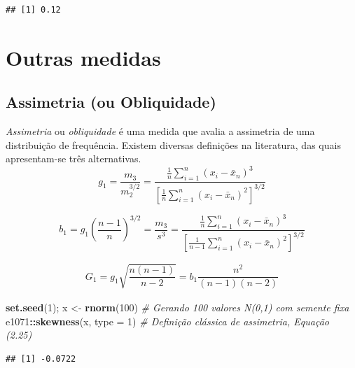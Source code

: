 \documentclass[
]{book}
\newenvironment{Shaded}{\begin{snugshade}}{\end{snugshade}}
\newcommand{\CommentTok}[1]{\textcolor[rgb]{0.56,0.35,0.01}{\textit{#1}}}
\newcommand{\DataTypeTok}[1]{\textcolor[rgb]{0.13,0.29,0.53}{#1}}
\newcommand{\DecValTok}[1]{\textcolor[rgb]{0.00,0.00,0.81}{#1}}
\newcommand{\KeywordTok}[1]{\textcolor[rgb]{0.13,0.29,0.53}{\textbf{#1}}}
\newcommand{\NormalTok}[1]{#1}
\newcommand{\OperatorTok}[1]{\textcolor[rgb]{0.81,0.36,0.00}{\textbf{#1}}}
\newcommand{\StringTok}[1]{\textcolor[rgb]{0.31,0.60,0.02}{#1}}
\theoremstyle{definition}
\theoremstyle{definition}
\theoremstyle{definition}
\theoremstyle{remark}
\begin{document}
\begin{verbatim}
## [1] 0.12
\end{verbatim}

\hypertarget{outras-medidas}{%
\section{Outras medidas}\label{outras-medidas}}

\hypertarget{assimetria-ou-obliquidade}{%
\subsection{Assimetria (ou Obliquidade)}\label{assimetria-ou-obliquidade}}

\emph{Assimetria} ou \emph{obliquidade} é uma medida que avalia a assimetria de uma distribuição de frequência. Existem diversas definições na literatura, das quais apresentam-se três alternativas.
\begin{equation}
g_1 = \dfrac{m_3}{m_2^{3/2}} = \dfrac{\frac{1}{n} \sum_{i=1}^{n} (x_{i} - \bar{x}_n)^3}{\left[ \frac{1}{n} \sum_{i=1}^{n} (x_{i} - \bar{x}_n)^2 \right]^{3/2}}
\label{eq:ass1}
\end{equation}

\begin{equation}
b_1 = g_{1} \left( \dfrac{n-1}{n} \right)^{3/2} = \dfrac{m_3}{s^3} = \dfrac{\frac{1}{n} \sum_{i=1}^{n} (x_{i} - \bar{x}_n)^3 }{\left[ \frac{1}{n-1} \sum_{i=1}^{n} (x_{i} - \bar{x}_n)^2 \right]^{3/2}}
\label{eq:ass3}
\end{equation}

\begin{eqnarray}
G_1 = g_{1} \sqrt{\dfrac{n(n-1)}{n-2}} = b_{1} \dfrac{n^2}{(n-1)(n-2)}
\label{eq:ass2}
\end{eqnarray}

\begin{Shaded}
\begin{Highlighting}[]
\KeywordTok{set.seed}\NormalTok{(}\DecValTok{1}\NormalTok{); x \textless{}{-}}\StringTok{ }\KeywordTok{rnorm}\NormalTok{(}\DecValTok{100}\NormalTok{)    }\CommentTok{\# Gerando 100 valores N(0,1) com semente fixa}
\NormalTok{e1071}\OperatorTok{::}\KeywordTok{skewness}\NormalTok{(x, }\DataTypeTok{type =} \DecValTok{1}\NormalTok{)    }\CommentTok{\# Definição clássica de assimetria, Equação (2.25)}
\end{Highlighting}
\end{Shaded}

\begin{verbatim}
## [1] -0.0722
\end{verbatim}
\end{document}
